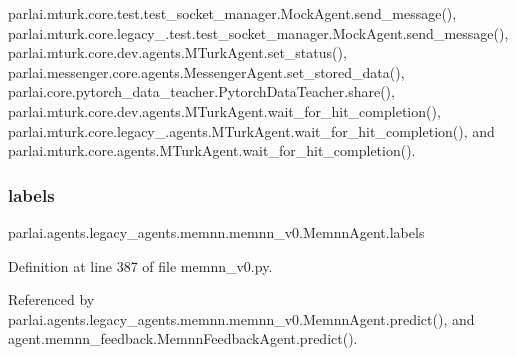 parlai.\+mturk.\+core.\+test.\+test\+\_\+socket\+\_\+manager.\+Mock\+Agent.\+send\+\_\+message(), parlai.\+mturk.\+core.\+legacy\+\_.\+test.\+test\+\_\+socket\+\_\+manager.\+Mock\+Agent.\+send\+\_\+message(), parlai.\+mturk.\+core.\+dev.\+agents.\+M\+Turk\+Agent.\+set\+\_\+status(), parlai.\+messenger.\+core.\+agents.\+Messenger\+Agent.\+set\+\_\+stored\+\_\+data(), parlai.\+core.\+pytorch\+\_\+data\+\_\+teacher.\+Pytorch\+Data\+Teacher.\+share(), parlai.\+mturk.\+core.\+dev.\+agents.\+M\+Turk\+Agent.\+wait\+\_\+for\+\_\+hit\+\_\+completion(), parlai.\+mturk.\+core.\+legacy\+\_.\+agents.\+M\+Turk\+Agent.\+wait\+\_\+for\+\_\+hit\+\_\+completion(), and parlai.\+mturk.\+core.\+agents.\+M\+Turk\+Agent.\+wait\+\_\+for\+\_\+hit\+\_\+completion().

\mbox{\label{classparlai_1_1agents_1_1legacy__agents_1_1memnn_1_1memnn__v0_1_1MemnnAgent_a5d56f023807667a1e589833d3d5220df}} 
\subsubsection{\texorpdfstring{labels}{labels}}
{\footnotesize\ttfamily parlai.\+agents.\+legacy\+\_\+agents.\+memnn.\+memnn\+\_\+v0.\+Memnn\+Agent.\+labels}



Definition at line 387 of file memnn\+\_\+v0.\+py.



Referenced by parlai.\+agents.\+legacy\+\_\+agents.\+memnn.\+memnn\+\_\+v0.\+Memnn\+Agent.\+predict(), and agent.\+memnn\+\_\+feedback.\+Memnn\+Feedback\+Agent.\+predict().

\mbox{\label{classparlai_1_1agents_1_1legacy__agents_1_1memnn_1_1memnn__v0_1_1MemnnAgent_a2f76bf7b117ffc19e89b2b6168026063}} 
